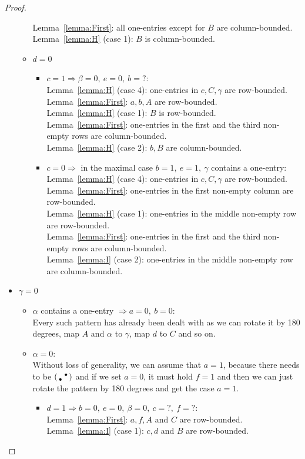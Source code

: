 \begin{proof}
\begin{itemize}
\begin{itemize}
				Lemma~\ref{lemma:First}: all one-entries except for $B$ are column-bounded.\\
				Lemma~\ref{lemma:H} (case 1): $B$ is column-bounded.
			\item $d=0$
				\begin{itemize}
					\item $c=1\Rightarrow\beta=0,\ e=0,\ b=?$:\\
						Lemma~\ref{lemma:H} (case 4): one-entries in $c,C,\gamma$ are row-bounded.\\
						Lemma~\ref{lemma:First}: $a,b,A$ are row-bounded.\\
						Lemma~\ref{lemma:H} (case 1): $B$ is row-bounded.\\
						
						Lemma~\ref{lemma:First}: one-entries in the first and the third non-empty rows are column-bounded.\\
						Lemma~\ref{lemma:H} (case 2): $b,B$ are column-bounded.
					\item $c=0\Rightarrow$ in the maximal case $b=1,\ e=1,\ \gamma$ contains a one-entry:\\
						Lemma~\ref{lemma:H} (case 4): one-entries in $c,C,\gamma$ are row-bounded.\\
						Lemma~\ref{lemma:First}: one-entries in the first non-empty column are row-bounded.\\
						Lemma~\ref{lemma:H} (case 1): one-entries in the middle non-empty row are row-bounded.\\
						
						Lemma~\ref{lemma:First}: one-entries in the first and the third non-empty rows are column-bounded.\\
						Lemma~\ref{lemma:I} (case 2): one-entries in the middle non-empty row are column-bounded.
				\end{itemize}
		\end{itemize}
	\item $\gamma=0$
		\begin{itemize}
			\item $\alpha$ contains a one-entry $\Rightarrow a=0,\ b=0$:\\
				Every such pattern has already been dealt with as we can rotate it by 180 degrees, map $A$ and $\alpha$ to $\gamma$, map $d$ to $C$ and so on.
			\item $\alpha=0$:\\
				Without loss of generality, we can assume that $a=1$, because there needs to be $\left(\begin{smallmatrix} &\bullet\\\bullet& \end{smallmatrix}\right)$ and if we set $a=0$, it must hold $f=1$ and then we can just rotate the pattern by 180 degrees and get the case $a=1$.
				\begin{itemize}
					\item $d=1\Rightarrow b=0,\ e=0,\ \beta=0,\ c=?,\ f=?$:\\
						Lemma~\ref{lemma:First}: $a,f,A$ and $C$ are row-bounded.\\
						Lemma~\ref{lemma:I} (case 1): $c,d$ and $B$ are row-bounded.\\
						

\end{itemize}
\end{itemize}
\end{itemize}
\end{proof}
